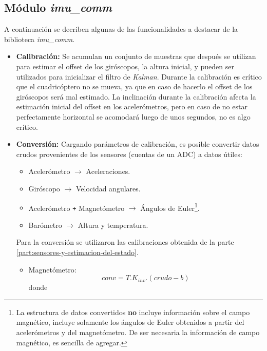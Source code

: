 \documentclass[main]{subfiles}
\begin{document}
\newpage
\subsection{M\'odulo \textit{imu\_comm}}
\label{sec:software:imu-comm}

A continuaci\'on se decriben algunas de las funcionalidades a destacar de la biblioteca \textit{imu\_comm}.

\begin{itemize}
\item \textbf{Calibración:} Se acumulan un conjunto de muestras que después se utilizan para estimar el offset de los giróscopos, la altura inicial, y pueden ser utilizados para inicializar el filtro de \textit{Kalman}. Durante la calibraci\'on es cr\'itico que el cuadric\'optero no se mueva, ya que en caso de hacerlo el offset de los gir\'oscopos ser\'a mal estimado.\newline
La inclinaci\'on durante la calibraci\'on afecta la estimaci\'on inicial del offset en los aceler\'ometros, pero en caso de no estar perfectamente horizontal se acomodar\'a luego de unos segundos, no es algo cr\'itico.
\item \textbf{Conversión:} Cargando parámetros de calibración, es posible convertir datos crudos provenientes de los sensores (cuentas de un ADC) a datos útiles:
  \begin{itemize}
  \item Aceler\'ometro $\rightarrow$ Aceleraciones.
  \item Gir\'oscopo $\rightarrow$ Velocidad angulares.
  \item Aceler\'ometro \verb~+~ Magnet\'ometro  $\rightarrow$ \'Angulos de Euler\footnote{La estructura de datos convertidos \textbf{no} incluye informaci\'on sobre el campo magn\'etico, incluye solamente los \'angulos de Euler obtenidos a partir del aceler\'ometros y del magnet\'ometro. De ser necesaria la informaci\'on de campo magn\'etico, es sencilla de agregar.}.
  \item Bar\'ometro $\rightarrow$ Altura y temperatura.
  \end{itemize}
Para la conversi\'on se utilizaron las calibraciones obtenida de la parte \ref{part:sensores-y-estimacion-del-estado}.
\begin{itemize}
\item Magnet\'ometro:
  \begin{equation}
    \label{eq:software:calib-lineal}
    conv = T.K_{inv}.(crudo - b)
  \end{equation}
  donde

\end{itemize}
\end{itemize}
\end{document}
